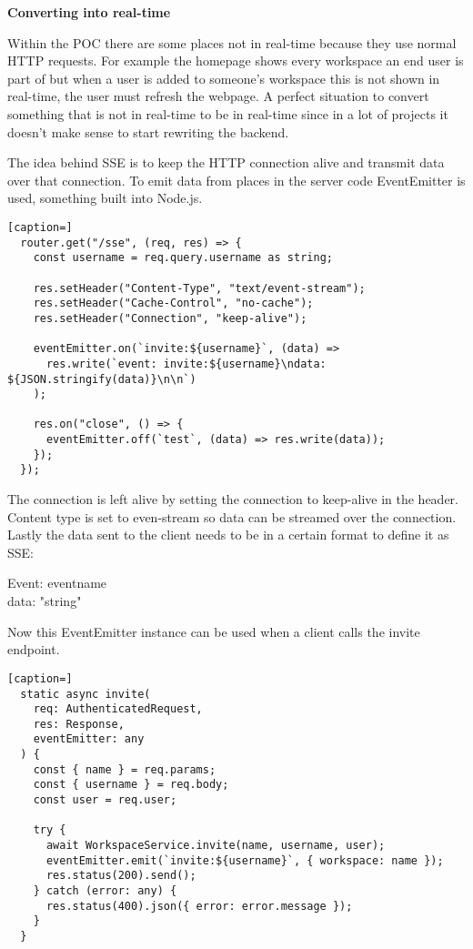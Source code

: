 \textbf{Converting into real-time}

Within the POC there are some places not in real-time because they use normal HTTP requests. For example the homepage shows every workspace an end user is part of but when a user is added to someone's workspace this is not shown in real-time, the user must refresh the webpage. A perfect situation to convert something that is not in real-time to be in real-time since in a lot of projects it doesn't make sense to start rewriting the backend.

The idea behind SSE is to keep the HTTP connection alive and transmit data over that connection. To emit data from places in the server code EventEmitter is used, something built into Node.js.

\begin{lstlisting}[caption=]
  router.get("/sse", (req, res) => {
    const username = req.query.username as string;
   
    res.setHeader("Content-Type", "text/event-stream");
    res.setHeader("Cache-Control", "no-cache");
    res.setHeader("Connection", "keep-alive");
   
    eventEmitter.on(`invite:${username}`, (data) =>
      res.write(`event: invite:${username}\ndata: ${JSON.stringify(data)}\n\n`)
    );
   
    res.on("close", () => {
      eventEmitter.off(`test`, (data) => res.write(data));
    });
  });
\end{lstlisting}

The connection is left alive by setting the connection to keep-alive in the header. Content type is set to even-stream so data can be streamed over the connection. Lastly the data sent to the client needs to be in a certain format to define it as SSE:

Event: eventname\\
data: "string"

Now this EventEmitter instance can be used when a client calls the invite endpoint.

\begin{lstlisting}[caption=]
  static async invite(
    req: AuthenticatedRequest,
    res: Response,
    eventEmitter: any
  ) {
    const { name } = req.params;
    const { username } = req.body;
    const user = req.user;
 
    try {
      await WorkspaceService.invite(name, username, user);
      eventEmitter.emit(`invite:${username}`, { workspace: name });
      res.status(200).send();
    } catch (error: any) {
      res.status(400).json({ error: error.message });
    }
  }
\end{lstlisting}

